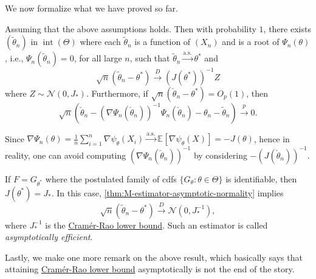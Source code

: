We now formalize what we have proved so far.

\begin{theorem}\label{thm:M-estimator-asymptotic-normality}
	Assuming that the above assumptions holds. Then with probability \(1\), there exists \((\widetilde{\theta} _n) \) in \(\operatorname{int}(\Theta )\) where each \(\widetilde{\theta} _n\) is a function of \((X_n)\) and is a root of \(\Psi _n(\theta )\), i.e., \(\Psi _n(\widetilde{\theta} _n) = 0\), for all large \(n\), such that \(\widetilde{\theta} _n \overset{\text{a.s.} }{\to} \theta ^{\ast} \) and
	\[
		\sqrt{n} (\widetilde{\theta} _n - \theta ^{\ast} )
		\overset{D}{\to} (J(\theta ^{\ast} ))^{-1} Z
	\]
	where \(Z \sim \mathcal{N} (0, J_{\ast} )\). Furthermore, if \(\sqrt{n} (\check{\theta }_n - \theta ^{\ast} ) = O_p(1)\), then
	\[
		\sqrt{n} \left( \check{\theta }_n - \left( \nabla \Psi _n(\check{\theta }_n) \right) ^{-1} \Psi _n(\check{\theta }_n) - \theta _n - \widetilde{\theta} _n \right)
		\overset{p}{\to} 0.
	\]
\end{theorem}

\begin{remark}
	Since \(\nabla \Psi _n(\theta ) = \frac{1}{n}\sum_{i=1}^{n} \nabla \psi _\theta (X_i) \overset{\text{a.s.} }{\to} \mathbb{E}_{}[\nabla \psi _\theta (X)] = - J(\theta )\), hence in reality, one can avoid computing \((\nabla \Psi _n(\check{\theta }_n))^{-1} \) by considering \(-(J(\check{\theta }_n))^{-1} \).
\end{remark}

\begin{eg}
	If \(F = G_{\theta ^{\ast} }\) where the postulated family of cdfs \(\{ G_\theta \colon \theta \in \Theta \} \) is identifiable, then \(J(\theta ^{\ast} ) = J_{\ast} \). In this case, \autoref{thm:M-estimator-asymptotic-normality} implies
	\[
		\sqrt{n} (\widetilde{\theta} _n - \theta ^{\ast} )
		\overset{D}{\to} \mathcal{N} (0, J_{\ast} ^{-1} ),
	\]
	where \(J_{\ast} ^{-1} \) is the \href{https://en.wikipedia.org/wiki/Cram%C3%A9r%E2%80%93Rao_bound}{Cramér-Rao lower bound}. Such an estimator is called \emph{asymptotically efficient}.
\end{eg}

Lastly, we make one more remark on the above result, which basically says that attaining \href{https://en.wikipedia.org/wiki/Cram%C3%A9r%E2%80%93Rao_bound}{Cramér-Rao lower bound} asymptotically is not the end of the story.


